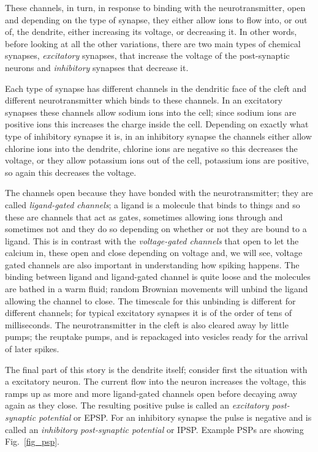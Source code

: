 \documentclass[12pt]{article}
\begin{document}
These channels, in turn, in response to binding with the
neurotransmitter, open and depending on the type of synapse, they
either allow ions to flow into, or out of, the dendrite, either
increasing its voltage, or decreasing it. In other words, before
looking at all the other variations, there are two main types of
chemical synapses, \textsl{excitatory} synapses, that increase the
voltage of the post-synaptic neurons and \textsl{inhibitory} synapses
that decrease it.

Each type of synapse has different channels in the dendritic face of
the cleft and different neurotransmitter which binds to these
channels. In an excitatory synapses these channels allow sodium ions
into the cell; since sodium ions are positive ions this increases the
charge inside the cell. Depending on exactly what type of inhibitory
synapse it is, in an inhibitory synapse the channels either allow
chlorine ions into the dendrite, chlorine ions are negative so this
decreases the voltage, or they allow potassium ions out of the cell,
potassium ions are positive, so again this decreases the voltage.

The channels open because they have bonded with the neurotransmitter;
they are called \textsl{ligand-gated channels}; a ligand is a molecule
that binds to things and so these are channels that act as gates,
sometimes allowing ions through and sometimes not and they do so
depending on whether or not they are bound to a ligand. This is in
contrast with the \textsl{voltage-gated channels} that open to let the
calcium in, these open and close depending on voltage and, we will
see, voltage gated channels are also important in understanding how
spiking happens. The binding between ligand and ligand-gated channel
is quite loose and the molecules are bathed in a warm fluid; random
Brownian movements will unbind the ligand allowing the channel to
close. The timescale for this unbinding is different for different
channels; for typical excitatory synapses it is of the order of tens
of milliseconds. The neurotransmitter in the cleft is also cleared
away by little pumps; the reuptake pumps, and is repackaged into
vesicles ready for the arrival of later spikes.

The final part of this story is the dendrite itself; consider first
the situation with a excitatory neuron. The current flow into the
neuron increases the voltage, this ramps up as more and more
ligand-gated channels open before decaying away again as they
close. The resulting positive pulse is called an \textsl{excitatory
  post-synaptic potential} or EPSP. For an inhibitory synapse the
pulse is negative and is called an \textsl{inhibitory post-synaptic
  potential} or IPSP. Example PSPs are showing Fig.~\ref{fig_psp}.
\end{document}
